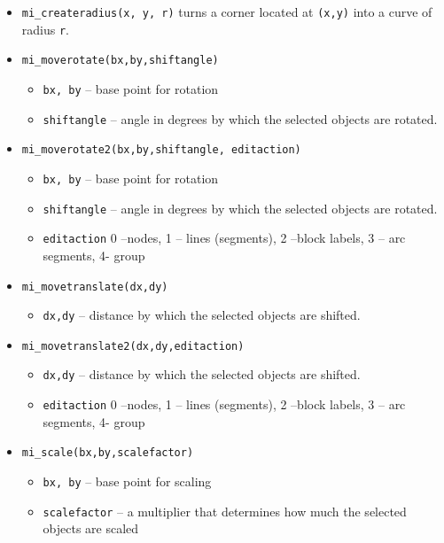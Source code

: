 \begin{itemize}
\item{\tt mi\_createradius(x, y, r)} turns a corner located at {\tt (x,y)} into a curve of radius {\tt r}.

\item{\tt mi\_moverotate(bx,by,shiftangle)}
        \begin{itemize}
        \item{\tt bx, by} -- base point for rotation
        \item{\tt shiftangle} -- angle in degrees by which the selected objects are rotated.
        \end{itemize}

\item{\tt mi\_moverotate2(bx,by,shiftangle, editaction)}
        \begin{itemize}
        \item{\tt bx, by} -- base point for rotation
        \item{\tt shiftangle} -- angle in degrees by which the selected objects are rotated.
        \item{\tt editaction}  0 --nodes, 1 -- lines (segments), 2 --block labels, 3 -- arc
                segments, 4- group
        \end{itemize}

\item{\tt mi\_movetranslate(dx,dy)}
        \begin{itemize}
        \item{\tt dx,dy} -- distance by which the selected objects are shifted.
        \end{itemize}

\item{\tt mi\_movetranslate2(dx,dy,editaction)}
        \begin{itemize}
        \item{\tt dx,dy} -- distance by which the selected objects are shifted.
        \item{\tt editaction}  0 --nodes, 1 -- lines (segments), 2 --block labels, 3 -- arc
                segments, 4- group
        \end{itemize}

\item{\tt mi\_scale(bx,by,scalefactor)}
        \begin{itemize}
        \item{\tt bx, by} -- base point for scaling
        \item{\tt scalefactor} -- a multiplier that determines how
        much the selected objects are scaled
        \end{itemize}


\end{itemize}
